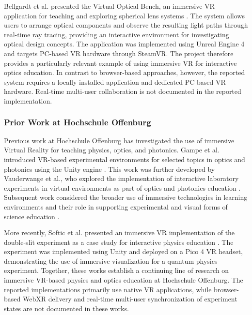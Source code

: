 Bellgardt et al. presented the Virtual Optical Bench, an immersive VR
application for teaching and exploring spherical lens systems
\cite{bellgardt2023virtualopticalbench}. The system allows users to arrange
optical components and observe the resulting light paths through real-time
ray tracing, providing an interactive environment for investigating optical
design concepts. The application was implemented using Unreal Engine 4 and
targets PC-based VR hardware through SteamVR. The project therefore provides
a particularly relevant example of using immersive VR for interactive optics
education. In contrast to browser-based approaches, however, the reported
system requires a locally installed application and dedicated PC-based VR
hardware. Real-time multi-user collaboration is not documented in the
reported implementation.


\subsubsection*{Prior Work at Hochschule Offenburg}

Previous work at Hochschule Offenburg has investigated the use of immersive
Virtual Reality for teaching physics, optics, and photonics. Gampe et al.
introduced VR-based experimental environments for selected topics in optics
and photonics using the Unity engine \cite{gampe2021vr}. This work was further
developed by Vauderwange et al., who explored the implementation of interactive
laboratory experiments in virtual environments as part of optics and photonics
education \cite{vauderwange2022vr}. Subsequent work considered the broader use
of immersive technologies in learning environments and their role in
supporting experimental and visual forms of science education
\cite{gampe2023immersive}.

More recently, Softic et al. presented an immersive VR implementation of the
double-slit experiment as a case study for interactive physics education
\cite{softic2025doubleslit}. The experiment was implemented using Unity and
deployed on a Pico 4 VR headset, demonstrating the use of immersive
visualization for a quantum-physics experiment. Together, these works establish
a continuing line of research on immersive VR-based physics and optics
education at Hochschule Offenburg. The reported implementations primarily use
native VR applications, while browser-based WebXR delivery and real-time
multi-user synchronization of experiment states are not documented in these
works.

